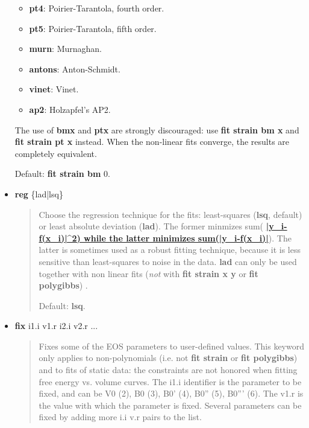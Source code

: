 \documentclass[a4paper]{article}
\begin{document}
\begin{itemize}
\begin{itemize}
\item \textbf{pt4}: Poirier-Tarantola, fourth order.

\item \textbf{pt5}: Poirier-Tarantola, fifth order.

\item \textbf{murn}: Murnaghan.

\item \textbf{antons}: Anton-Schmidt.

\item \textbf{vinet}: Vinet.

\item \textbf{ap2}: Holzapfel's AP2.
\end{itemize}

The use of \textbf{bmx} and \textbf{ptx} are strongly discouraged: use \textbf{fit
strain bm x} and \textbf{fit strain pt x} instead. When the non-linear
fits converge, the results are completely equivalent.

Default: \textbf{fit strain bm} 0.

\item \textbf{reg} \{lad|lsq\}

\begin{quote}
Choose the regression technique for the fits: least-squares
(\textbf{lsq}, default) or least absolute deviation (\textbf{lad}). The
former minmizes sum(%
\hyperlink{id11}{\textbf{\color{red}|y\_i-f(x\_i)|\textasciicircum{}2) while the latter minimizes
sum(|y\_i-f(x\_i)|}}). The latter is sometimes used as a robust fitting
technique, because it is less sensitive than least-squares to noise
in the data. \textbf{lad} can only be used together with non linear
fits (\emph{not} with \textbf{fit strain x y} or \textbf{fit polygibbs}) .

Default: \textbf{lsq}.
\end{quote}

\item \textbf{fix} i1.i v1.r i2.i v2.r ...

\begin{quote}
Fixes some of the EOS parameters to user-defined values. This
keyword only applies to non-polynomials (i.e. not \textbf{fit strain} or
\textbf{fit polygibbs}) and to fits of static data: the constraints are
not honored when fitting free energy vs. volume curves. The i1.i
identifier is the parameter to be fixed, and can be V0 (2), B0 (3),
B0' (4), B0'' (5), B0''' (6). The v1.r is the value with which the
parameter is fixed. Several parameters can be fixed by adding more
i.i v.r pairs to the list.


\end{quote}
\end{itemize}
\end{document}
